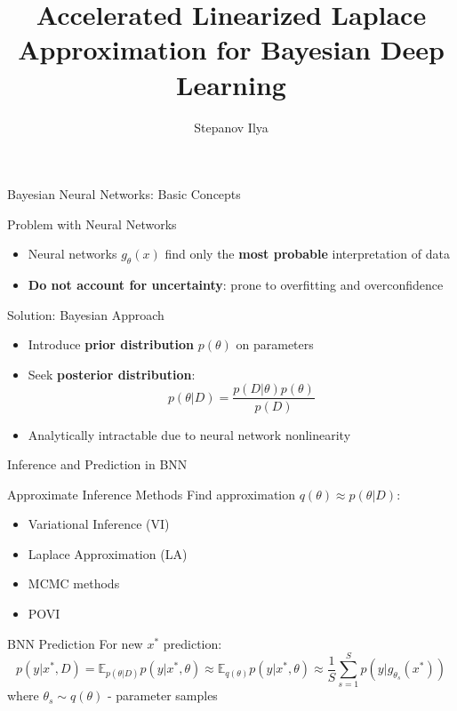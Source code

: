\documentclass{beamer}
\title[\hbox to 56mm{Генерация}]{Accelerated Linearized Laplace Approximation for Bayesian Deep Learning}
\author[N.\,P.~Ivkin]{Stepanov Ilya}
\institute{Moscow Institute of Physics and Technology}
\date{\footnotesize
\par\bigskip\small 2025}
\begin{document}
\begin{frame}
\thispagestyle{empty}
\maketitle
\end{frame}


\begin{frame}{Bayesian Neural Networks: Basic Concepts}

\begin{block}{Problem with Neural Networks}
\begin{itemize}
\item Neural networks $g_\theta(x)$ find only the \textbf{most probable} interpretation of data
\item \textbf{Do not account for uncertainty}: prone to overfitting and overconfidence
\end{itemize}
\end{block}

\begin{block}{Solution: Bayesian Approach}
\begin{itemize}
\item Introduce \textbf{prior distribution} $p(\theta)$ on parameters
\item Seek \textbf{posterior distribution}: 
$$p(\theta|D) = \frac{p(D|\theta)p(\theta)}{p(D)}$$
\item Analytically intractable due to neural network nonlinearity
\end{itemize}
\end{block}

\end{frame}

\begin{frame}{Inference and Prediction in BNN}

\begin{block}{Approximate Inference Methods}
Find approximation $q(\theta) \approx p(\theta|D)$:
\begin{itemize}
\item Variational Inference (VI)
\item Laplace Approximation (LA)
\item MCMC methods
\item POVI
\end{itemize}
\end{block}

\begin{block}{BNN Prediction}
For new $x^*$ prediction:
$$p(y|x^*,D) = \mathbb{E}_{p(\theta|D)}p(y|x^*,\theta) \approx \mathbb{E}_{q(\theta)}p(y|x^*,\theta) \approx \frac{1}{S}\sum_{s=1}^S p(y|g_{\theta_s}(x^*))$$
where $\theta_s \sim q(\theta)$ - parameter samples
\end{block}

\end{frame}
\end{document}
